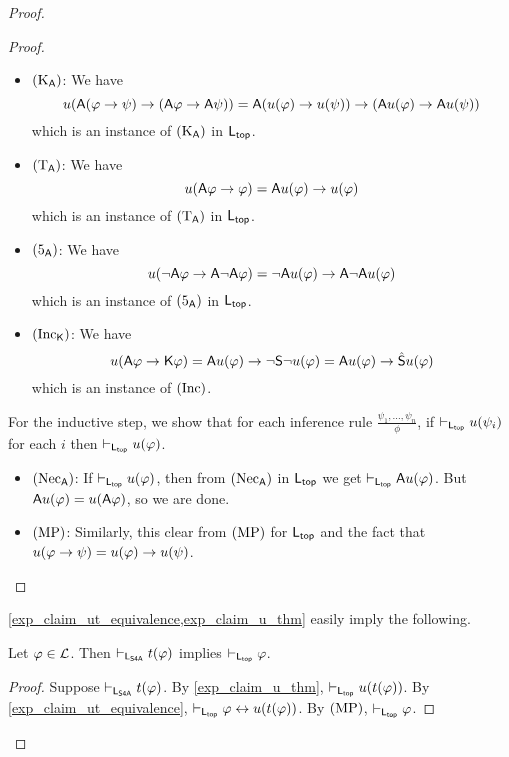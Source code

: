 \begin{proof}
\begin{proof}
\begin{itemize}
        \item $(\text{K}_{\mathsf{A}})$: We have
        \[
        u(\mathsf{A}(\varphi \to \psi) \to (\mathsf{A}\varphi \to \mathsf{A}\psi))
=
\mathsf{A} (u(\varphi) \to u(\psi)) \to (\mathsf{A} u(\varphi) \to \mathsf{A} u(\psi))\]
        which is an instance of $(\text{K}_{\mathsf{A}})$ in $\mathsf{L}_{\mathsf{top}}$.

        \item $(\text{T}_{\mathsf{A}})$: We have
        \[
        u(\mathsf{A}\varphi \to \varphi)
=
\mathsf{A} u(\varphi) \to u(\varphi)\]
        which is an instance of $(\text{T}_{\mathsf{A}})$ in $\mathsf{L}_{\mathsf{top}}$.

        \item $(\text{5}_{\mathsf{A}})$: We have
        \[
        u(\neg\mathsf{A}\varphi \to \mathsf{A}\neg\mathsf{A}\varphi)
=
\neg\mathsf{A} u(\varphi) \to \mathsf{A} \neg\mathsf{A} u(\varphi)\]
        which is an instance of $(\text{5}_{\mathsf{A}})$ in $\mathsf{L}_{\mathsf{top}}$.

        \item $(\text{Inc}_{\mathsf{K}})$: We have
        \[
        u(\mathsf{A}\varphi \to \mathsf{K}\varphi)
=
\mathsf{A} u(\varphi) \to \neg\mathsf{S}\neg u(\varphi)
=
\mathsf{A} u(\varphi) \to \hat{\mathsf{S}} u(\varphi)\]
        which is an instance of $(\text{Inc})$.

        \end{itemize}
    For the inductive step, we show that for each inference rule
$\frac{\psi_1,\ldots,\psi_n}{\phi}$, if
$\vdash_{\mathsf{L}_{\mathsf{top}}}u(\psi_i)$ for each $i$ then
$\vdash_{\mathsf{L}_{\mathsf{top}}}u(\varphi)$.

    \begin{itemize}
    \item $(\text{Nec}_{\mathsf{A}})$: If $\vdash_{\mathsf{L}_{\mathsf{top}}} u(\varphi)$, then from
$(\text{Nec}_{\mathsf{A}})$ in $\mathsf{L}_{\mathsf{top}}$ we get
$\vdash_{\mathsf{L}_{\mathsf{top}}} \mathsf{A} u(\varphi)$. But $\mathsf{A} u(\varphi) =
u(\mathsf{A}\varphi)$, so we are done.

        \item $(\text{MP})$: Similarly, this clear from $(\text{MP})$ for
$\mathsf{L}_{\mathsf{top}}$ and the fact that $u(\varphi \to \psi) =
u(\varphi) \to u(\psi)$.

        \end{itemize}
    \end{proof}

\cref{exp_claim_ut_equivalence,exp_claim_u_thm} easily imply the following.

\begin{claim}
\label{exp_claim_t_thm}

Let $\varphi \in \mathcal{L}$. Then
$\vdash_{\mathsf{L}_{\mathsf{S4A}}} t(\varphi)$ implies $\vdash_{\mathsf{L}_{\mathsf{top}}}
\varphi$.

\end{claim}

    \begin{proof}
    Suppose $\vdash_{\mathsf{L}_{\mathsf{S4A}}} t(\varphi)$. By \cref{exp_claim_u_thm},
$\vdash_{\mathsf{L}_{\mathsf{top}}} u(t(\varphi))$. By \cref{exp_claim_ut_equivalence},
$\vdash_{\mathsf{L}_{\mathsf{top}}} \varphi \leftrightarrow u(t(\varphi))$. By
$(\text{MP})$, $\vdash_{\mathsf{L}_{\mathsf{top}}} \varphi$.
    \end{proof}


\end{proof}
